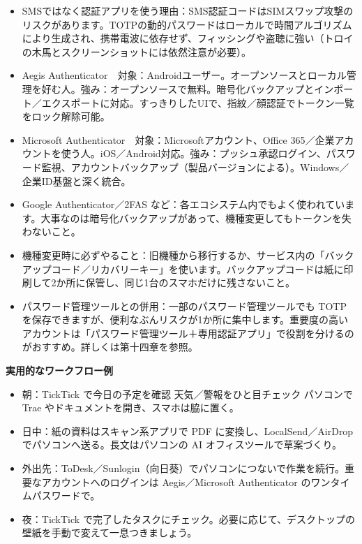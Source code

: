 
\begin{itemize}
  \item SMSではなく認証アプリを使う理由：SMS認証コードはSIMスワップ攻撃のリスクがあります。TOTPの動的パスワードはローカルで時間アルゴリズムにより生成され、携帯電波に依存せず、フィッシングや盗聴に強い（トロイの木馬とスクリーンショットには依然注意が必要）。
  \item Aegis Authenticator　対象：Androidユーザー。オープンソースとローカル管理を好む人。強み：オープンソースで無料。暗号化バックアップとインポート／エクスポートに対応。すっきりしたUIで、指紋／顔認証でトークン一覧をロック解除可能。
  \item Microsoft Authenticator　対象：Microsoftアカウント、Office 365／企業アカウントを使う人。iOS／Android対応。強み：プッシュ承認ログイン、パスワード監視、アカウントバックアップ（製品バージョンによる）。Windows／企業ID基盤と深く統合。
  \item Google Authenticator／2FAS など：各エコシステム内でもよく使われています。大事なのは暗号化バックアップがあって、機種変更してもトークンを失わないこと。
  \item 機種変更時に必ずやること：旧機種から移行するか、サービス内の「バックアップコード／リカバリーキー」を使います。バックアップコードは紙に印刷して2か所に保管し、同じ1台のスマホだけに残さないこと。
  \item パスワード管理ツールとの併用：一部のパスワード管理ツールでも TOTP を保存できますが、便利なぶんリスクが1か所に集中します。重要度の高いアカウントは「パスワード管理ツール＋専用認証アプリ」で役割を分けるのがおすすめ。詳しくは第十四章を参照。
\end{itemize}


\textbf{実用的なワークフロー例}\par

\begin{itemize}
  \item 朝：TickTick で今日の予定を確認 天気／警報をひと目チェック パソコンで Trae やドキュメントを開き、スマホは脇に置く。
  \item 日中：紙の資料はスキャン系アプリで PDF に変換し、LocalSend／AirDrop でパソコンへ送る。長文はパソコンの AI オフィスツールで草案づくり。
  \item 外出先：ToDesk／Sunlogin（向日葵）でパソコンにつないで作業を続行。重要なアカウントへのログインは Aegis／Microsoft Authenticator のワンタイムパスワードで。
  \item 夜：TickTick で完了したタスクにチェック。必要に応じて、デスクトップの壁紙を手動で変えて一息つきましょう。
\end{itemize}

